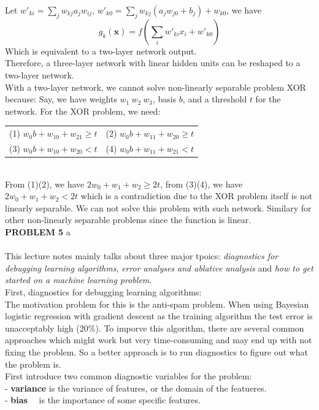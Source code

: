\documentclass[11pt,a4paper,fleqn]{article}
\begin{document}
Let $w'_{ki}=\sum_jw_{kj}a_jw_{ij}$, $w'_{k0}=\sum_jw_{kj}(a_jw_{j0}+b_j)+w_{k0}$, we have
$$g_k(\mathbf{x}) = f(\sum_iw'_{ki}x_i+w'_{k0})$$
Which is equivalent to a two-layer network output.\\
Therefore, a three-layer network with linear hidden units can be reshaped to a two-layer network.\\
With a two-layer network, we cannot solve non-linearly separable problem XOR because: Say, we have weights $w_1\ w_2\ w_3$, basis $b$, and a threshold $t$ for the network. For the XOR problem, we need:\\
\begin{tabular}{cc}
(1) $w_0b+w_10+w_21 \ge t$&(2) $w_0b+w_11+w_20 \ge t$\\
(3) $w_0b+w_10+w_20 < t$&(4) $w_0b+w_11+w_21 < t$\\
\end{tabular}\\
From (1)(2), we have $2w_0+w_1+w_2 \ge 2t$, from (3)(4), we have $2w_0+w_1+w_2 < 2t$ which is a contradiction due to the XOR problem itself is not linearly separable. We can not solve this problem with such network. Similary for other non-linearly separable problems since the function is linear.\\
\newpage \noindent
\textbf{PROBLEM 5} a\\ \\
This lecture notes mainly talks about three major tpoics: \textit{diagnostics for debugging learning algorithms}, \textit{error analyses and ablative analysis} and \textit{how to get started on a machine learning problem}.\\
First, diagnostics for debugging learning algorithms:\\
The motivation problem for this is the anti-spam problem. When using Bayesian logistic regression with gradient descent as the training algorithm the test error is unacceptably high (20\%). 
To imporve this algorithm, there are several common approaches which might work but very time-consuming and may end up with not fixing the problem. 
So a better approach is to run diagnostics to figure out what the problem is.\\
First introduce two common diagnostic variables for the problem: \\
\indent - \textbf{variance} \indent is the variance of features, or the domain of the featueres.\\
\indent - \textbf{bias} \indent\indent\ \  is the importance of some specific features.\\
\end{document}
